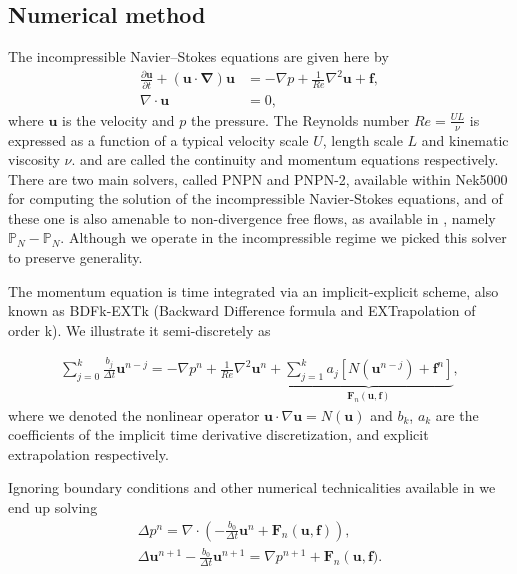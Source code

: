 \documentclass{sig-alternate}
\begin{document}
\subsection{Numerical method}
\label{sec:method}
The incompressible Navier--Stokes equations are given here by
\begin{align} 
 \frac{\partial \mathbf{u}}{\partial t} + (\mathbf{u \cdot \nabla}) \mathbf{u} & = - \nabla p + \frac{1}{Re} \nabla^2 \mathbf{u} + \mathbf{f} \label{eqn:NS_momentum},\\
 \nabla \cdot \mathbf{u} & = 0, \label{eqn:NS_continuity}
\end{align}
where $\mathbf{u}$ is the velocity and $p$ the pressure. The Reynolds number 
$Re = \frac{U L}{\nu}$ is expressed as a function of a typical velocity scale $U$,
length scale $L$ and kinematic viscosity $\nu$.  
and  are called the continuity and momentum equations 
respectively. There are two main solvers, called PNPN and PNPN-2, available within 
Nek5000 for computing the solution of the incompressible 
Navier-Stokes equations, and of these one is also amenable to non-divergence free 
flows, as available in \cite{Tomboulides1997}, namely $\mathbb{P}_N-\mathbb{P}_N$. Although we operate in the incompressible
regime we picked this solver to preserve generality. 

The momentum equation is time integrated via an implicit-explicit scheme, also
known as BDFk-EXTk (Backward Difference formula and EXTrapolation of order k). We
illustrate it semi-discretely as

\begin{eqnarray}
\sum\limits_{j=0}^k \frac{b_j}{\Delta t} \mathbf u^{n-j}  = - \nabla p^{n}+\frac{1}{Re}\nabla^2\mathbf u^{n}+\underbrace{\sum\limits_{j=1}^k a_j [N(\mathbf u^{n-j})+\mathbf f^{n}]}_{\mathbf{F}_n(\mathbf u,\mathbf f)},\label{eqn:discrete}
\end{eqnarray}
where we denoted the nonlinear operator $\mathbf u \cdot \nabla \mathbf u=N(\mathbf u)$ and $b_k$, $a_k$ are the coefficients of the implicit time derivative discretization, and explicit extrapolation respectively.

Ignoring boundary conditions and other numerical technicalities available in \cite{Tomboulides1997} we end up solving
\begin{eqnarray}
 \Delta p^{n} = \nabla \cdot \left( -\frac{b_0}{\Delta t} \mathbf{u}^{n} + \mathbf{F}_n \left( \mathbf{u},\mathbf f \right) \right), \label{eqn:hmhz_pres}\\
 \Delta \mathbf{u}^{n+1}- \frac{b_0}{\Delta t} \mathbf{u}^{n+1}  =  \nabla p^{n+1} + \mathbf{F}_n \left( \mathbf{u}, \mathbf f) \right. . \label{eqn:hmhz_vel}
\end{eqnarray}
\end{document}
